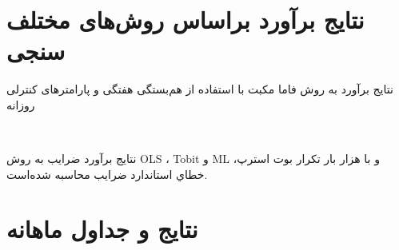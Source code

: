 \documentclass[12pt]{article}
\begin{document}
\begin{appendices}





\section{نتایج برآورد براساس روش‌های مختلف سنجی}
\label{sa.2}
 
 
 \begin{table}[htbp]
 \centering
 \begin{LTR}
 \lr{}
 \end{LTR}
 \caption{نتایج برآورد به روش فاما مکبت با استفاده از هم‌بستگی هفتگی و پارامتر‌های کنترلی روزانه}
 \label{t13}
 \end{table}
 

 \begin{table}[htbp]
  \centering
  \begin{LTR}
  \lr{} ‌ ‌ %
  \end{LTR}
  \caption{نتایج برآورد ضرایب به روش 
  OLS 
  ،
  Tobit
  و
  ML
  و با
  هزار بار تكرار بوت استرپ، خطاي استاندارد ضرايب محاسبه شده‌است. }
  \label{t16}
  \end{table}
 
 \FloatBarrier
 
 \section{نتایج و جداول ماهانه}
 \label{sa.1}
       \begin{table}[htbp]
         \centering
             \caption{خلاصه آماری پارامتر‌های ماهانه   }
             \label{t6}
       \end{table}
  

\end{appendices}
\end{document}
